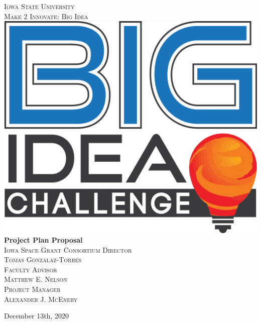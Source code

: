 \documentclass[10pt]{article}
\begin{document}
\begin{titlepage}
\centering
\textsc{\LARGE{Iowa State University}}\\[0.5 cm]
\textsc{\LARGE{Make 2 Innovate: Big Idea}}\\[0.7 cm]
\includegraphics[scale=0.25]{BigIdea.png}\\[0.35 cm]
\huge{\textbf{Project Plan Proposal}}\\[0.7 cm]%


\textsc{\large Iowa Space Grant Consortium Director \ \\ Tomas Gonzalaz-Torres}\\[0.5cm] %

\textsc{\Large Faculty Advisor \ \\ Matthew E. Nelson}\\[0.5cm] %

\textsc{\Large Project Manager \ \\ Alexander J. McEnery}\\[0.5cm]

\vspace{-0.25cm}


\vspace{-1.3cm}
\mbox{}\vfill\large{December 13th, 2020} %
\end{titlepage}
\end{document}
